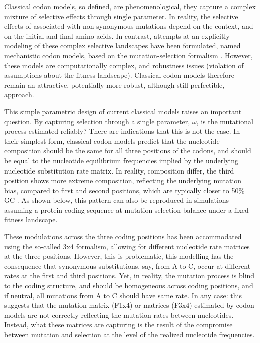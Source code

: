 Classical codon models, so defined, are phenomenological, they capture a complex mixture of selective effects through single parameter.
In reality, the selective effects of associated with non-synonymous mutations depend on the context, and on the initial and final amino-acids.
In contrast, attempts at an explicitly modeling of these complex selective landscapes have been formulated, named mechanistic codon models, based on the mutation-selection formalism \citep{Halpern1998}.
However, these models are computationally complex, and robustness issues (violation of assumptions about the fitness landscape).
Classical codon models therefore remain an attractive, potentially more robust, although still perfectible, approach.

This simple parametric design of current classical models raises an important question.
By capturing selection through a single parameter, $\omega$, is the mutational process estimated reliably?
There are indications that this is not the case.
In their simplest form, classical codon models predict that the nucleotide composition should be the same for all three positions of the codons, and should be equal to the nucleotide equilibrium frequencies implied by the underlying nucleotide substitution rate matrix.
In reality, composition differ, the third position shows more extreme composition, reflecting the underlying mutation bias, compared to first and second positions, which are typically closer to 50\% GC \citep{Singer2000}.
As shown below, this pattern can also be reproduced in simulations assuming a protein-coding sequence at mutation-selection balance under a fixed fitness landscape.

These modulations across the three coding positions has been accommodated using the so-called 3x4 formalism, allowing for different nucleotide rate matrices at the three positions.
However, this is problematic, this modelling has the consequence that synonymous substitutions, say, from A to C, occur at different rates at the first and third positions.
Yet, in reality, the mutation process is blind to the coding structure, and should be homogeneous across coding positions, and if neutral, all mutations from A to C should have same rate.
In any case: this suggests that the mutation matrix (F1x4) or matrices (F3x4) estimated by codon models are not correctly reflecting the mutation rates between nucleotides.
Instead, what these matrices are capturing is the result of the compromise between mutation and selection at the level of the realized nucleotide frequencies.

